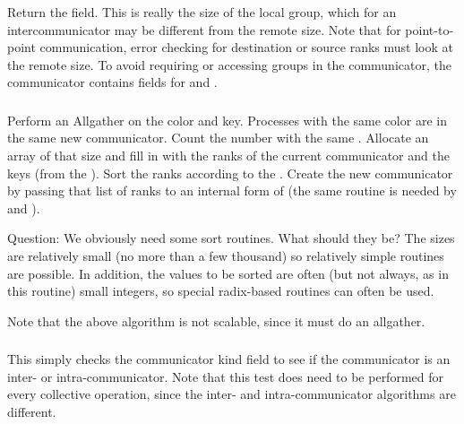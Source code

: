 \documentclass{article}
\begin{document}
\subsubsection{}
Return the  field.  This is really the size of the local
group, which for an intercommunicator may be different from the remote
size.  Note that for point-to-point communication, error checking for
destination or source ranks must look at the remote size.  To avoid
requiring or accessing groups in the communicator, the communicator
contains fields for  and
. 

\subsubsection{}
Perform an Allgather on the color and key.  Processes with the same color are
in the same new communicator.  Count the number with the same
.  Allocate an array of that size and fill in with the
ranks of the current communicator and the keys (from the
).  Sort the ranks according to the .
Create the new communicator by passing that list of ranks to an
internal form of  (the same routine is needed
by  and ). 

Question: We obviously need some sort routines.  What should they be?
The sizes are relatively small (no more than a few thousand) so
relatively simple routines are possible.  In addition, the values to
be sorted are often (but not always, as in this routine) small
integers, so special radix-based routines can often be used.

Note that the above algorithm is not scalable, since it must do an 
allgather.  

\subsubsection{}


This simply checks the communicator kind field to see if the
communicator is an inter- or intra-communicator.
Note that this test does need to be performed for every collective operation,
since the inter- and intra-communicator algorithms are different.
\end{document}
